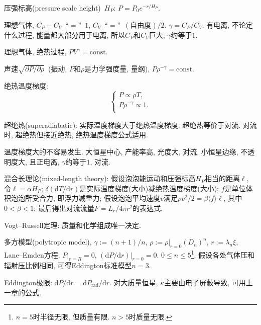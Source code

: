 压强标高(pressure scale height)~$H_P$: $P=P_0e^{-r/H_P}$.

理想气体, $C_P-C_V$~``$=$''~$1$, $C_V$~``$=$''~$(\text{自由度})/2$. $\gamma=C_P/C_V$. 有电离, 不论定什么过程, 能量都大部分用于电离, 所以$C_P$和$C_V$巨大, $\gamma$约等于$1$.

理想气体, 绝热过程, $PV^\gamma=\text{const}$.

声速$\sqrt{\partial P/\partial \rho}$~(振动, $P$和$\rho$是力学强度量, 量纲), $P
\rho^{-\gamma}=\text{const}$.

绝热温度梯度:
\begin{equation*}
    \begin{cases}
        P\propto \rho T, \\
        P\rho^{-\gamma} \propto 1. \\
    \end{cases}
\end{equation*}

超绝热(superadiabatic): 实际温度梯度大于绝热温度梯度. 超绝热等价于对流. 对流时, 超绝热但接近绝热, 绝热温度梯度公式适用.

温度梯度大的不容易发生. 大恒星中心, 产能率高, 光度大, 对流. 小恒星边缘, 不透明度大, 且正电离, $\gamma$约等于$1$, 对流.

混合长理论(mixed-length theory): 假设泡泡能运动和压强标高$H_P$相当的距离$\ell$, 令$\ell=\alpha H_P$; $\delta(\mathrm{d}T/\mathrm{d}r)$是实际温度梯度(大小)减绝热温度梯度(大小); $f$是单位体积泡泡所受合力, 即浮力减重力; 假设泡泡平均速度$\bar{v}$满足$\rho\bar{v}^2/2=\beta\langle f\rangle\ell$, 其中$0<\beta<1$; 最后得出对流流量$F=L_r/4\pi r^2$的表达式.

Vogt--Russell定理: 质量和化学组成唯一决定.

多方模型(polytropic model), $\gamma:=(n+1)/n$, $\rho:=\rho|_{r=0}(D_n)^n$, $r:=\lambda_n\xi$, Lane--Emden方程. $P|_{r=R}=0$, $(\mathrm{d}P/\mathrm{d}r)|_{r=0}=0$. $0\le n \le 5$\footnote{
    $n=5$时半径无限, 但质量有限. $n>5$时质量无限.
}. 假设各处气体压和辐射压比例相同, 可得Eddington标准模型$n=3$.

Eddington极限: $\mathrm{d}P/\mathrm{d}r=\mathrm{d}P_\text{rad}/\mathrm{d}r$. 对大质量恒星, $\bar{\kappa}$主要由电子屏蔽导致, 可用上一章的公式.
